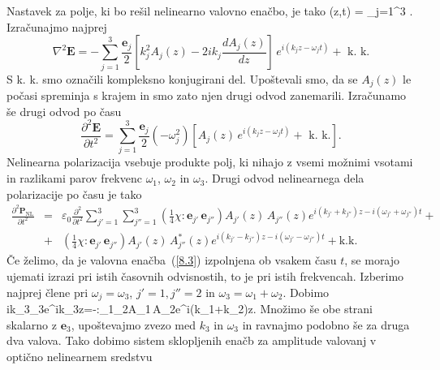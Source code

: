 Nastavek za polje, ki bo rešil nelinearno valovno enačbo, je tako
\beq
{}(z,t) = \sum_{j=1}^3 .
\label{eq:nlnastavek}
\eeq
Izračunajmo najprej 
\begin{equation}
\nabla^{2}\mathbf{E}=-\sum_{j=1}^3 \frac{\mathbf{e}_{j}}{2}\left[k_{j}^{2}A_{j}(z)-2ik_{j}
\frac{dA_{j}(z)}{dz}\right]\, e^{i(k_{j}z-\omega_{j}t)}+\mbox{ k. k.}
\label{8.5}
\end{equation}
S k. k. smo označili kompleksno konjugirani del. Upoštevali smo,
da se $A_{j}(z)$ le počasi spreminja s krajem in smo zato njen
drugi odvod zanemarili.
Izračunamo še drugi odvod po času 
\begin{equation}
\frac{\partial^2\mathbf{E}}{\partial t^2}=\sum_{j=1}^3 \frac{\mathbf{e}_{j}}{2}
\left(-\omega_j^2\right) \left[A_{j}(z)\, e^{i(k_{j}z-\omega_{j}t)}+\mbox{ k. k.}\right].
\label{8.5a}
\end{equation}
Nelinearna polarizacija vsebuje produkte polj, ki nihajo z vsemi možnimi
vsotami in razlikami parov frekvenc $\omega_{1}$, $\omega_{2}$ in
$\omega_{3}$. Drugi odvod nelinearnega dela polarizacije po času je tako
\begin{eqnarray}
\frac{\partial^2\mathbf{P}_\mathrm{NL}}{\partial t^2}&=&\varepsilon_0 \frac{\partial^2}
{\partial t^2}\sum_{j'=1}^3 \sum_{j''=1}^3 
 \left( \frac{1}{4} \chi:\mathbf{e}_{j'}\,\mathbf{e}_{j''}\right) 
 A_{j'}(z)\,A_{j''}(z) e^{i(k_{j'}+k_{j''})z-i(\omega_{j'}+\omega_{j''})t}+ \nonumber\\
&+& \left( \frac{1}{4} \chi:\mathbf{e}_{j'}\,\mathbf{e}_{j''}\right)
A_{j'}(z)\,A_{j''}^*(z) e^{i(k_{j'}-k_{j''})z-i(\omega_{j'}-\omega_{j''})t}+ \mathrm{k. k.}
\label{8.5b}
\end{eqnarray}
Če želimo, da je valovna enačba~(\ref{8.3}) izpolnjena ob vsakem času $t$, se morajo
ujemati izrazi pri istih časovnih odvisnostih, to je pri istih frekvencah. Izberimo
najprej člene pri $\omega_j = \omega_3$, $j'=1, j''=2$ in $\omega_3 = \omega_1 + \omega_2$. Dobimo
\beq
ik_{3}_{3}e^{ik_{3}z}=-\chi:_{1}_{2}A_{1}\,A_{2}e^{i(k_{1}+k_{2})z}.
\label{8.7}
\eeq
Množimo še obe strani skalarno z $\mathbf{e}_{3}$, upoštevajmo zvezo med $k_{3}$ in $\omega_{3}$ in 
ravnajmo podobno še za druga dva valova. Tako dobimo sistem sklopljenih
enačb za amplitude valovanj v optično nelinearnem sredstvu
